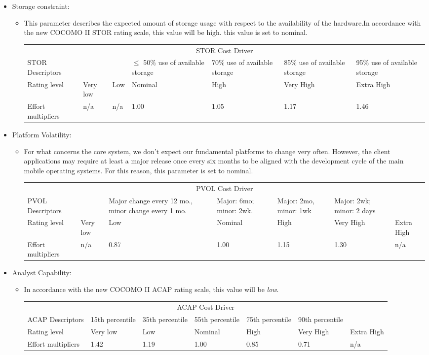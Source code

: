 \documentclass[english]{article}
\newenvironment{costdriverstable}[1]{
	\setlength{\LTleft}{-40pt}
	\begin{longtable}{|p{\dimexpr.16\textwidth}|p{\dimexpr.14\textwidth}|p{\dimexpr.14\textwidth}|p{\dimexpr.14\textwidth}|p{\dimexpr.14\textwidth}|p{\dimexpr.14\textwidth}|p{\dimexpr.14\textwidth}|}
	\hline
	\multicolumn{7}{|c|}{{#1}}\\\hhline{|=======|}
}{
	\hline\end{longtable}
}
\newcommand{\costdescriptors}[7]{
	#1 & #2 & #3 & #4 & #5 & #6 & #7\\
}
\newcommand{\ratinglevel}[6]{
	Rating level & #1 & #2 & #3 & #4 & #5 & #6 \\\hline
}
\newcommand{\effortmultipliers}[6]{
	Effort multipliers & #1 & #2 & #3 & #4 & #5 & #6 \\\hline
}
\begin{document}
\begin{itemize}
	\item Storage constraint: 
	\begin{itemize}
	\item[] This parameter describes the expected amount of storage usage with respect to the availability of the hardware.In accordance with the new COCOMO II STOR rating scale, this value will be high. this value is set to nominal.
	\begin{costdriverstable}{STOR Cost Driver}
		\costdescriptors{STOR Descriptors}{}{}{$\le$  50\% use of available storage}{70\% use of available storage}{85\% use of available storage} {95\% use of available storage}\hline
		\ratinglevel{Very low}{Low}{Nominal}{High}{Very High}{Extra High}
		\effortmultipliers{n/a}{n/a}{1.00}{1.05}{1.17}{1.46}	
	\end{costdriverstable}
	\end{itemize}
\end{itemize}

\begin{itemize}
	\item Platform Volatility: 
	\begin{itemize}
	\item[] For what concerns the core system, we don't expect our fundamental platforms to change very often. However, the client applications may require at least a major release once every six months to be aligned with the development cycle of the main mobile operating systems. For this reason, this parameter is set to nominal.
	\pagebreak
	\begin{costdriverstable}{PVOL Cost Driver}
		\costdescriptors{PVOL Descriptors}{}{Major change every 12 mo., minor change every 1 mo.}{Major: 6mo; minor: 2wk.}{Major: 2mo, minor: 1wk}	{Major: 2wk; minor: 2 days}{}\hline
		\ratinglevel{Very low}{Low}{Nominal}{High}{Very High}{Extra High}
		\effortmultipliers{n/a}{0.87}{1.00}{1.15}{1.30}{n/a}
	\end{costdriverstable}
	\end{itemize}
\end{itemize}

\begin{itemize}
	\item Analyst Capability: 
	\begin{itemize}
	\item[] In accordance with the new COCOMO II ACAP rating scale, this value will be \textit{low}.
	\begin{costdriverstable}{ACAP Cost Driver}
		\costdescriptors{ACAP Descriptors}{15th percentile}{35th percentile}{55th percentile}{75th percentile}{90th percentile}{}\hline
		\ratinglevel{Very low}{Low}{Nominal}{High}{Very High}{Extra High}
		\effortmultipliers{1.42}{1.19}{1.00}{0.85}{0.71}{n/a}	
	\end{costdriverstable}
	\end{itemize}
\end{itemize}
\end{document}
